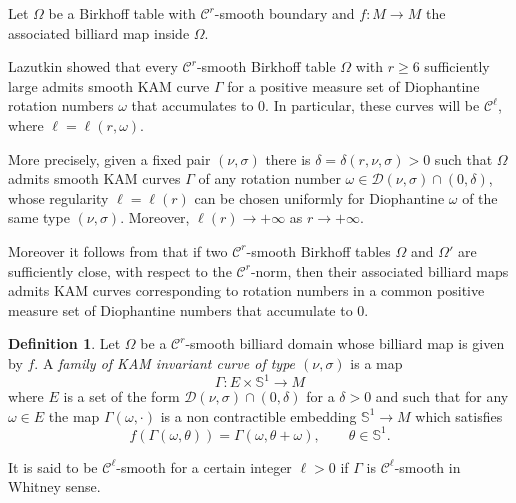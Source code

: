 \documentclass[12pt, openany]{amsart}
\newtheorem{theorem}{Theorem}%
\theoremstyle{definition}
\newtheorem{definition}[theorem]{Definition}
\theoremstyle{remark}
\theoremstyle{remark}
\theoremstyle{theorem}
\theoremstyle{theorem}
\theoremstyle{theorem}
\theoremstyle{theorem}
\renewcommand{\SS}{\mathbb{S}}
\begin{document}
Let $\Omega$ be a Birkhoff table with $\mathscr C^r$-smooth boundary and $f:M\to M$ the associated billiard map inside $\Omega$. 

Lazutkin \cite{Lazutkin} showed that every $\mathscr C^r$-smooth Birkhoff table $\Omega$ with $r\geq 6$ sufficiently large admits smooth KAM curve $\Gamma$ for a positive measure set of Diophantine rotation numbers $\omega$ that accumulates to $0$. In particular, these curves will be $\mathscr C^\ell$, where $\ell=\ell(r, \omega)$. 

More precisely, given a fixed pair $(\nu,\sigma)$ there is $\delta = \delta(r, \nu,\sigma)>0$ such that $\Omega$ admits smooth KAM curves $\Gamma$ of any rotation number $\omega\in \mathcal D(\nu,\sigma)\cap(0,\delta)$, whose regularity $\ell=\ell(r)$ can be chosen uniformly for Diophantine $\omega$ of the same type $(\nu,\sigma)$. Moreover, $\ell(r)\to+\infty$ as $r\to+\infty$.


%
%
%

Moreover it follows from \cite{Douady} that  if two $\mathscr C^r$-smooth Birkhoff tables $\Omega$ and $\Omega'$ are sufficiently close, with respect to the $\mathscr C^r$-norm, then their associated billiard maps admits KAM curves corresponding to rotation numbers in  a common positive measure set of Diophantine numbers that accumulate to $0$. 

\begin{definition}
\label{definition:KAM_family_curves}
Let $\Omega$ be a $\mathscr C^r$-smooth billiard domain whose billiard map is given by $f$. A \textit{family of KAM invariant curve of type $(\nu,\sigma)$} is a map
\[
\Gamma: E\times\SS^1\to M
\]
where $E$ is a set of the form $\mathcal D(\nu,\sigma)\cap(0,\delta)$ for a $\delta>0$ and such that for any $\omega\in E$ the map $\Gamma(\omega,\cdot)$ is a non contractible embedding $\SS^1\longrightarrow M$ which satisfies
\[
f\left(\Gamma(\omega,\theta)\right)=\Gamma(\omega,\theta+\omega),\qquad\theta\in\SS^1.
\]

It is said to be $\mathscr C^{\ell}$-smooth for a certain integer $\ell>0$ if $\Gamma$ is $\mathscr C^{\ell}$-smooth in  Whitney sense.
\end{definition}
\end{document}
